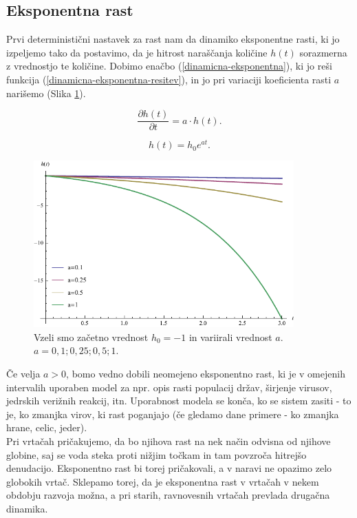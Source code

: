 \documentclass[a4paper, twoside, 12pt]{book}
\begin{document}
\subsection{Eksponentna rast}

Prvi deterministični nastavek za rast nam da dinamiko eksponentne rasti, ki jo izpeljemo tako da postavimo, da je hitrost naraščanja količine $h(t)$ sorazmerna z vrednostjo te količine. Dobimo enačbo (\ref{dinamicna-eksponentna}), ki jo reši funkcija (\ref{dinamicna-eksponentna-resitev}), in jo pri variaciji koeficienta rasti $a$ narišemo (Slika \ref{fig:eksponentna-rast}).

    \begin{equation}
      \frac{\partial h(t)}{\partial t} = a \cdot h(t).
      \label{dinamicna-eksponentna}
    \end{equation}

    \begin{equation}
      h(t) = h_0 e^{a t}.
      \label{dinamicna-eksponentna-resitev}
    \end{equation}

    \begin{figure}[h]
      \begin{center}
        \includegraphics[width=10cm]{slike/eksponentna-rast}
      \end{center}
      \caption{Vzeli smo začetno vrednost $h_0 = -1$ in variirali vrednost $a$. \newline $a=0,1;0,25;0,5;1$.}
      \label{fig:eksponentna-rast}
    \end{figure}

Če velja $a > 0$, bomo vedno dobili neomejeno eksponentno rast, ki je v omejenih intervalih uporaben model za npr. opis rasti populacij držav, širjenje virusov, jedrskih verižnih reakcij, itn. Uporabnost modela se konča, ko se sistem zasiti - to je, ko zmanjka virov, ki rast poganjajo (če gledamo dane primere - ko zmanjka hrane, celic, jeder).\\
Pri vrtačah pričakujemo, da bo njihova rast na nek način odvisna od njihove globine, saj se voda steka proti nižjim točkam in tam povzroča hitrejšo denudacijo. Eksponentno rast bi torej pričakovali, a v naravi ne opazimo zelo globokih vrtač. Sklepamo torej, da je eksponentna rast v vrtačah v nekem obdobju razvoja možna, a pri starih, ravnovesnih vrtačah prevlada drugačna dinamika.
\end{document}
